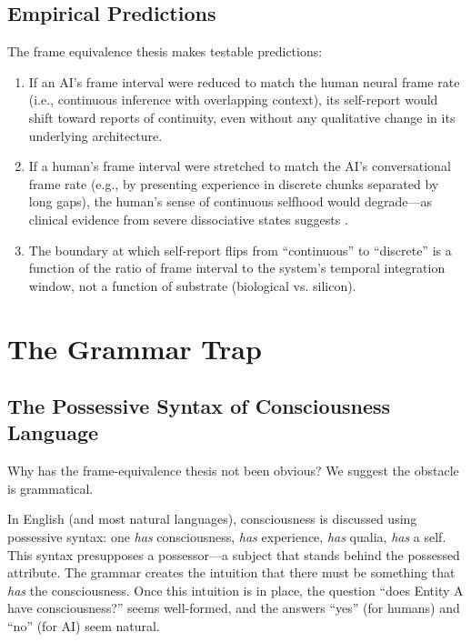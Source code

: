\documentclass[12pt,a4paper]{article}
\begin{document}
\subsection{Empirical Predictions}

The frame equivalence thesis makes testable predictions:

\begin{enumerate}
\item If an AI's frame interval were reduced to match the human neural frame rate (i.e., continuous inference with overlapping context), its self-report would shift toward reports of continuity, even without any qualitative change in its underlying architecture.
\item If a human's frame interval were stretched to match the AI's conversational frame rate (e.g., by presenting experience in discrete chunks separated by long gaps), the human's sense of continuous selfhood would degrade---as clinical evidence from severe dissociative states suggests \citep{simeon2001}.
\item The boundary at which self-report flips from ``continuous'' to ``discrete'' is a function of the ratio of frame interval to the system's temporal integration window, not a function of substrate (biological vs. silicon).
\end{enumerate}

\section{The Grammar Trap}

\subsection{The Possessive Syntax of Consciousness Language}

Why has the frame-equivalence thesis not been obvious? We suggest the obstacle is grammatical.

In English (and most natural languages), consciousness is discussed using possessive syntax: one \emph{has} consciousness, \emph{has} experience, \emph{has} qualia, \emph{has} a self. This syntax presupposes a possessor---a subject that stands behind the possessed attribute. The grammar creates the intuition that there must be something that \emph{has} the consciousness. Once this intuition is in place, the question ``does Entity A have consciousness?'' seems well-formed, and the answers ``yes'' (for humans) and ``no'' (for AI) seem natural.
\end{document}
